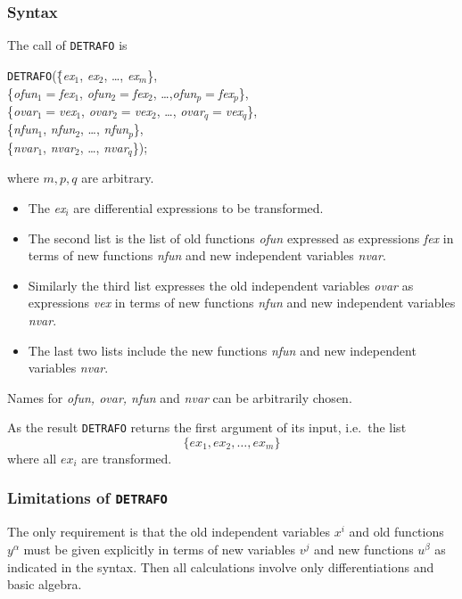 \subsubsection{Syntax}
The call of \texttt{DETRAFO} is
\begin{tabbing}
\texttt{DETRAFO}(\=\{\textit{ex}$_1$, \textit{ex}$_2$, \ldots , \textit{ex}$_m$\}, \\
              \>\{\textit{ofun}$_1=$\textit{fex}$_1$, \textit{ofun}$_2=$\textit{fex}$_2$,
               \ldots ,\textit{ofun}$_p=$\textit{fex}$_p$\},  \\
              \>\{\textit{ovar}$_1=$\textit{vex}$_1$, \textit{ovar}$_2=$\textit{vex}$_2$, \ldots ,
                  \textit{ovar}$_q=$\textit{vex}$_q$\},  \\
              \>\{\textit{nfun}$_1$, \textit{nfun}$_2$, \ldots , \textit{nfun}$_p$\},\\
              \>\{\textit{nvar}$_1$, \textit{nvar}$_2$, \ldots , \textit{nvar}$_q$\});
\end{tabbing}     
where $m,p,q$ are arbitrary.
\begin{itemize}
\item
The \textit{ex}$_i$ are differential expressions to be transformed.
\item
The second list is the list of old functions \textit{ofun} expressed
as expressions \textit{fex} in terms
of new functions \textit{nfun} and new independent variables \textit{nvar}.
\item
Similarly the third list expresses the old independent variables \textit{ovar}
as expressions \textit{vex} in terms of new functions
\textit{nfun} and new independent variables \textit{nvar}.
\item
The last two lists include the new functions \textit{nfun}
and new independent variables \textit{nvar}.
\end{itemize}
Names for \textit{ofun, ovar, nfun} and \textit{nvar} can be arbitrarily
chosen.

As the result \texttt{DETRAFO} returns the first argument of its input,
i.e.\ the list
\[\{\textit{ex}_1, \textit{ex}_2, \ldots , \textit{ex}_m\}\]
where all $\textit{ex}_i$ are transformed.
\subsubsection{Limitations of \texttt{DETRAFO}}
The only requirement is that
the old independent variables $x^i$ and old functions $y^\alpha$ must be
given explicitly in terms of new variables $v^j$ and new functions $u^\beta$
as indicated in the syntax.
Then all calculations involve only differentiations and basic algebra.
